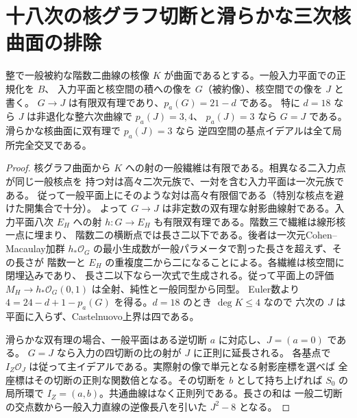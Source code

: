 \section{十八次の核グラフ切断と滑らかな三次核曲面の排除}
\label{sec:cofactor-eighteen-sectional-graph}
\begin{theorem}\label{thm:cofactor-sectional-graph-genus}
整で一般被約な階数二曲線の核像 $K$ が曲面であるとする。一般入力平面での正規化を $B$、
入力平面と核空間の積への像を $G$（被約像）、核空間での像を $J$ と書く。
$G\to J$ は有限双有理であり、$p_a(G)=21-d$ である。
特に $d=18$ なら $J$ は非退化な整六次曲線で $p_a(J)=3,4$、
$p_a(J)=3$ なら $G=J$ である。滑らかな核曲面に双有理で $p_a(J)=3$ なら
逆四空間の基点イデアルは全て局所完全交叉である。
\end{theorem}
\begin{proof}
核グラフ曲面から $K$ への射の一般繊維は有限である。相異なる二入力点が同じ一般核点を
持つ対は高々二次元族で、一対を含む入力平面は一次元族である。
従って一般平面上にそのような対は高々有限個である（特別な核点を避けた開集合で十分）。
よって $G\to J$ は非定数の双有理な射影曲線射である。入力平面八次 $E_H$ への射
$h:G\to E_H$ も有限双有理である。階数三で繊維は線形核一点に埋まり、
階数二の横断点では長さ二以下である。後者は一次元Cohen--Macaulay加群
$h_*\mathcal O_G$ の最小生成数が一般パラメータで割った長さを超えず、その長さが
階数一と $E_H$ の重複度二から二になることによる。各繊維は核空間に閉埋込みであり、
長さ二以下なら一次式で生成される。従って平面上の評価
$M_H\to h_*\mathcal O_G(0,1)$ は全射、純性と一般同型から同型。
Euler数より $4=24-d+1-p_a(G)$ を得る。$d=18$ のとき $\deg K\le4$ なので
六次の $J$ は平面に入らず、Castelnuovo上界は四である。

滑らかな双有理の場合、一般平面はある逆切断 $a$ に対応し、$J=(a=0)$ である。
$G=J$ なら入力の四切断の比の射が $J$ に正則に延長される。
各基点で $I_Z\mathcal O_J$ は従って主イデアルである。実際射の像で単元となる射影座標を選べば
全座標はその切断の正則な関数倍となる。その切断を $b$ として持ち上げれば
$S_0$ の局所環で $I_Z=(a,b)$。共通曲線はなく正則列である。長さの和は
一般二切断の交点数から一般入力直線の逆像長八を引いた $J^2-8$ となる。
\end{proof}

